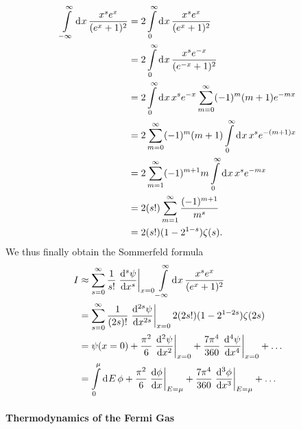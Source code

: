 \begin{align*}
	\int\limits_{-\infty}^{\infty}\dd[]{x}\frac{x^{s}e^{x}}{(e^{x} + 1)^{2}} &= 2\int\limits_{0}^{\infty}\dd[]{x}\frac{x^{s}e^{x}}{(e^{x} + 1)^{2}} \\
	                                                               &= 2\int\limits_{0}^{\infty}\dd[]{x}\frac{x^{s}e^{-x}}{(e^{-x} + 1)^{2}} \\
	                                                               &= 2\int\limits_{0}^{\infty}\dd[]{x}x^{s}e^{-x}\sum\limits_{m = 0}^{\infty}(-1)^{m}(m + 1)e^{-mx} \\
	                                                               &= 2\sum\limits_{m = 0}^{\infty}(-1)^{m}(m + 1)\int\limits_{0}^{\infty}\dd[]{x}x^{s}e^{-(m + 1)x} \\
	                                                               &= 2\sum\limits_{m = 1}^{\infty}(-1)^{m + 1}m\int\limits_{0}^{\infty}\dd[]{x}x^{s}e^{-mx} \\
	                                                               &= 2(s!)\sum\limits_{m = 1}^{\infty}\frac{(-1)^{m + 1}}{m^{s}} \\
	                                                               &= 2(s!)(1 - 2^{1 - s})\zeta(s).
\end{align*}
We thus finally obtain the Sommerfeld formula
\begin{align*}
	I &\approx \sum\limits_{s = 0}^{\infty}\frac{1}{s!}\eval{\dv[s]{\psi}{x}}_{x = 0}\integ{-\infty}{\infty}{x}{\frac{x^{s}e^{x}}{(e^{x} + 1)^{2}}} \\
	  &= \sum\limits_{s = 0}^{\infty}\frac{1}{(2s)!}\eval{\dv[2s]{\psi}{x}}_{x = 0}2(2s!)(1 - 2^{1 - 2s})\zeta(2s) \\
	  &= \psi(x = 0) + \frac{\pi^{2}}{6}\eval{\dv[2]{\psi}{x}}_{x = 0} + \frac{7\pi^{4}}{360}\eval{\dv[4]{\psi}{x}}_{x = 0} + \dots \\
	  &= \integ{0}{\mu}{E}{\phi} + \frac{\pi^{2}}{6}\eval{\dv{\phi}{x}}_{E = \mu} + \frac{7\pi^{4}}{360}\eval{\dv[3]{\phi}{x}}_{E = \mu} + \dots
\end{align*}

\paragraph{Thermodynamics of the Fermi Gas}

